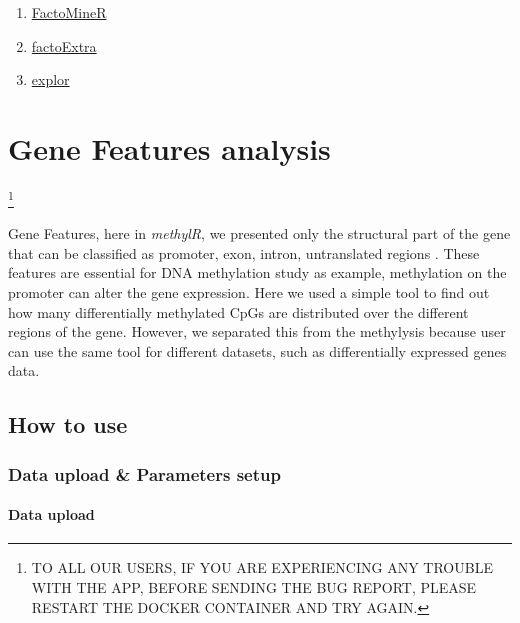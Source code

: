 \documentclass[
  a4paper,
  oneside,
  open=any]{scrreport}
\providecommand{\tightlist}{%
  \setlength{\itemsep}{0pt}\setlength{\parskip}{0pt}}\usepackage{longtable,booktabs,array}
\begin{document}
\begin{enumerate}
\def\labelenumi{\arabic{enumi}.}
\tightlist
\item
  \href{https://cran.r-project.org/web/packages/FactoMineR/FactoMineR.pdf}{FactoMineR}
\item
  \href{https://cran.r-project.org/web/packages/factoextra/factoextra.pdf}{factoExtra}
\item
  \href{https://cran.r-project.org/web/packages/explor/explor.pdf}{explor}
\end{enumerate}

\hypertarget{sec-genfeatures}{%
\chapter{Gene Features analysis}\label{sec-genfeatures}}

\footnote{TO ALL OUR USERS, IF YOU ARE EXPERIENCING ANY TROUBLE WITH THE
  APP, BEFORE SENDING THE BUG REPORT, PLEASE RESTART THE DOCKER
  CONTAINER AND TRY AGAIN.}

Gene Features, here in \emph{methylR}, we presented only the structural
part of the gene that can be classified as promoter, exon, intron,
untranslated regions \autocite{skolnick2000structural}. These features
are essential for DNA methylation study as example, methylation on the
promoter can alter the gene expression. Here we used a simple tool to
find out how many differentially methylated CpGs are distributed over
the different regions of the gene. However, we separated this from the
methylysis because user can use the same tool for different datasets,
such as differentially expressed genes data.

\hypertarget{how-to-use-3}{%
\section{How to use}\label{how-to-use-3}}

\hypertarget{data-upload-parameters-setup-1}{%
\subsection{Data upload \& Parameters
setup}\label{data-upload-parameters-setup-1}}

\hypertarget{data-upload-1}{%
\subsubsection{Data upload}\label{data-upload-1}}
\end{document}
